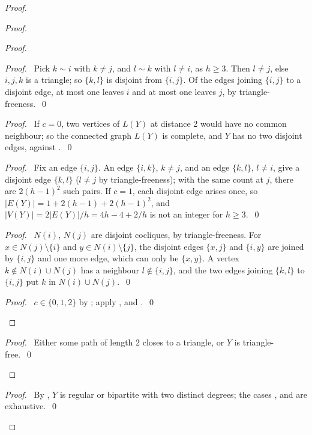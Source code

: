 \begin{proof}
\begin{proof}
\begin{proof}
   \begin{proof}\pf\ Pick $k\sim i$ with $k\ne j$, and $l\sim k$ with $l\ne i$, as $h\ge3$. Then
    $l\ne j$, else $i,j,k$ is a triangle; so $\{k,l\}$ is disjoint from $\{i,j\}$. Of the edges joining
    $\{i,j\}$ to a disjoint edge, at most one leaves $i$ and at most one leaves $j$, by
    triangle-freeness.~\qed\end{proof}
   \begin{proof}\pf\ If $c=0$, two vertices of $L(Y)$ at distance 2 would have no common
    neighbour; so the connected graph $L(Y)$ is complete, and $Y$ has no two disjoint edges,
    against .~\qed\end{proof}
   \begin{proof}\pf\ Fix an edge $\{i,j\}$. An edge $\{i,k\}$, $k\ne j$, and an edge
    $\{k,l\}$, $l\ne i$, give a disjoint edge $\{k,l\}$ ($l\ne j$ by triangle-freeness); with the
    same count at $j$, there are $2(h-1)^2$ such pairs. If $c=1$, each disjoint edge arises
    once, so $|E(Y)|=1+2(h-1)+2(h-1)^2$, and $|V(Y)|=2|E(Y)|/h=4h-4+2/h$ is not an integer for
    $h\ge3$.~\qed\end{proof}
   \begin{proof}\pf\ $N(i)$, $N(j)$ are disjoint cocliques, by triangle-freeness. For
    $x\in N(j)\setminus\{i\}$ and $y\in N(i)\setminus\{j\}$, the disjoint edges $\{x,j\}$ and
    $\{i,y\}$ are joined by $\{i,j\}$ and one more edge, which can only be $\{x,y\}$. A vertex
    $k\notin N(i)\cup N(j)$ has a neighbour $l\notin\{i,j\}$, and the two edges joining
    $\{k,l\}$ to $\{i,j\}$ put $k$ in $N(i)\cup N(j)$.~\qed\end{proof}
   \qedstep
   \begin{proof}\pf\ $c\in\{0,1,2\}$ by ; apply ,
     and .~\qed\end{proof}
  \end{proof}
  \qedstep
  \begin{proof}\pf\ Either some path of length 2 closes to a triangle, or $Y$ is
   triangle-free.~\qed\end{proof}
 \end{proof}
 \qedstep
 \begin{proof}\pf\ By , $Y$ is regular or bipartite with two distinct degrees;
  the cases ,  and  are
  exhaustive.~\qed\end{proof}
\end{proof}

